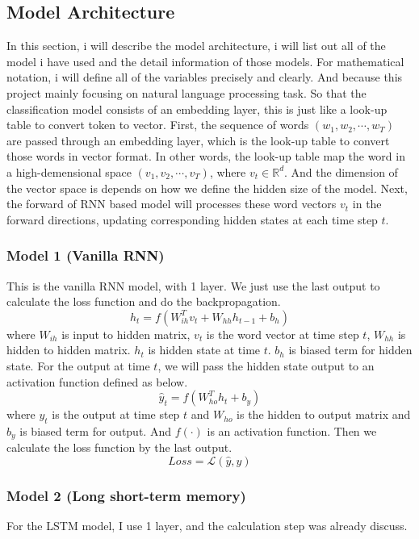 \documentclass[12pt,a4paper]{article}
\begin{document}
\subsection{Model Architecture}
In this section, i will describe the model architecture, i will list out all of the model i have used and the detail information of those models. For mathematical notation, i will define all of the variables precisely and clearly. And because this project mainly focusing on natural language processing task. So that the classification model consists of an embedding layer, this is just like a look-up table to convert token to vector. First, the sequence of words $(w_1, w_2, \cdots, w_T)$ are passed through an embedding layer, which is the look-up table to convert those words in vector format. In other words, the look-up table map the word in a high-demensional space $(v_1, v_2, \cdots, v_T)$, where $v_t \in \mathbb{R}^d$. And the dimension of the vector space is depends on how we define the hidden size of the model. Next, the forward of RNN based model will processes these word vectors $v_t$ in the forward directions, updating corresponding hidden states at each time step $t$. 

\subsubsection{Model 1 (Vanilla RNN)}
This is the vanilla RNN model, with 1 layer. We just use the last output to calculate the loss function and do the backpropagation.
\begin{equation}
    h_t = f(W_{ih}^Tv_t+W_{hh}h_{t-1}+b_h)
\end{equation}
where $W_{ih}$ is input to hidden matrix, $v_t$ is the word vector at time step $t$, $W_{hh}$ is hidden to hidden matrix. $h_t$ is hidden state at time $t$. $b_h$ is biased term for hidden state. For the output at time $t$, we will pass the hidden state output to an activation function defined as below. 
\begin{equation}
    \hat{y}_t = f(W_{ho}^Th_{t}+b_y)
\end{equation}
where $y_t$ is the output at time step $t$ and $W_{ho}$ is the hidden to output matrix and $b_y$ is biased term for output. And $f(\cdot)$ is an activation function. Then we calculate the loss function by the last output.
\begin{equation}
    Loss = \mathcal{L}(\hat{y}, y)
\end{equation}

\subsubsection{Model 2 (Long short-term memory)}
For the LSTM model, I use 1 layer, and the calculation step was already discuss. 
\end{document}
